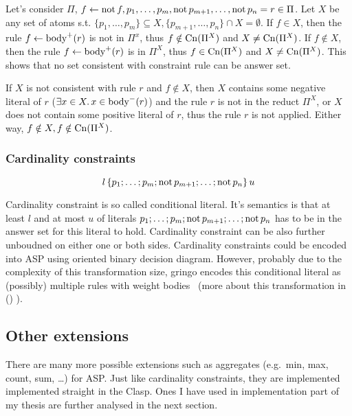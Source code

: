 \documentclass{fithesis}
\begin{document}

Let's consider $\Pi$, $f \leftarrow{} \mathrm{not}\, f, p_1, \dots, p_m,
\mathrm{not}\, p_{m+1}, \dots, \mathrm{not}\, p_n = r \in \Pi$. Let $X$ be
any set of atoms s.t. $\{p_1, \dots, p_m\}\subseteq X,
\{p_{m+1}, \dots, p_n\}\cap X = \emptyset$. If $f\in X$, then the rule
$f \leftarrow{} \mathrm{body}^+(r)$ is not in $\Pi^x$, thus $f\notin \mathrm{Cn}(\Pi^X)$
and $X \neq \mathrm{Cn}(\Pi^X)$. If $f\notin X$, then the rule
$f \leftarrow{} \mathrm{body}^+(r)$ is in $\Pi^X$, thus $f\in \mathrm{Cn}(\Pi^X)$
and $X\neq \mathrm{Cn}(\Pi^X)$. This shows that no set consistent with constraint
rule can be answer set.

If $X$ is not consistent with rule $r$ and $f\notin X$,
then $X$ contains some negative literal
of $r$ ($\exists x\in X.\, x\in \mathrm{body}^-(r)$) and the rule $r$ is not in the
reduct $\Pi^X$, or $X$ does not contain some positive literal of $r$, thus the
rule $r$ is not applied. Either way, $f\notin X, f\notin \mathrm{Cn}(\Pi^X)$.

\subsubsection{Cardinality constraints}

\begin{equation*}
    l\, \{p_1; \dots; p_m; \mathrm{not}\, p_{m+1}; \dots; \mathrm{not}\, p_n\} \,u
\end{equation*}

Cardinality constraint is so called conditional literal. It's semantics is that
at least $l$ and at most $u$ of literals
$p_1; \dots; p_m; \mathrm{not}\, p_{m+1}; \dots; \mathrm{not}\, p_n$
has to be in the answer set for this literal to hold.
Cardinality constraint can be also further unboudned on either one or both
sides. Cardinality constraints
could be encoded into ASP using oriented binary decision diagram.
However, probably due to the complexity of this transformation size, gringo
encodes this conditional literal as (possibly) multiple rules with weight
bodies~\cite{aspEasy2016} (more about this transformation in ()%
).


\subsection{Other extensions}

There are many more possible extensions such as aggregates (e.g.\ min, max,
count, sum, \dots) for ASP\@. Just like cardinality constraints, they are
implemented implemented straight in the Clasp. 
Ones I have used in implementation part of my
thesis are further analysed in the next section.
\end{document}
